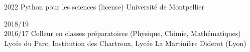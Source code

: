 \documentclass[letterpaper]{cvtemplate_fr} %
\begin{document}
\begin{cvbody}

\cvitem
	{2022}
	{}
	{Python pour les sciences (license)}
	{Université de Montpellier }
	{}{}{}
	{}
	{}

\cvitem
	{2018/19\\ \mbox{}\hfill 2016/17}
	{}
	{Colleur en classes pr\'eparatoires (Physique, Chimie, Mathématiques)}
	{Lyc\'ee du Parc, Institution des Chartreux, Lyc\'ee La Martinière Diderot (Lyon) }
	{}{}{}
	{}
	{
	}



\end{cvbody}
\end{document}
